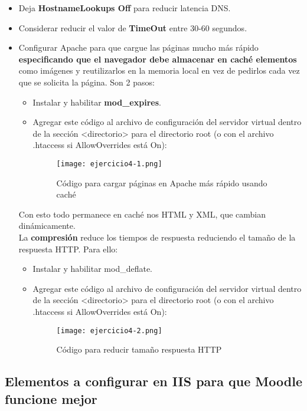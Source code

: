 \begin{itemize}
		\item Deja \textbf{HostnameLookups Off} para reducir latencia DNS.
		\item Considerar reducir el valor de \textbf{TimeOut} entre 30-60 segundos.
		\item Configurar Apache para que cargue las páginas mucho más rápido \textbf{especificando que el navegador debe almacenar en caché elementos} como imágenes y reutilizarlos en la memoria local en vez de pedirlos cada vez que se solicita la página. Son 2 pasos:
			\begin{itemize}
				\item Instalar y habilitar \textbf{mod\_expires}.
				\item Agregar este código al archivo de configuración del servidor virtual dentro de la sección <directorio> para el directorio root (o con el archivo .htaccess si AllowOverrides está On):
					\begin{figure}[H] 
						\centering
						\texttt{[image: ejercicio4-1.png]} 
						\label{figura21} 
						\caption{Código para cargar páginas en Apache más rápido usando caché}
					\end{figure}
			\end{itemize}
		Con esto todo permanece en caché nos HTML y XML, que cambian dinámicamente. \\
		La \textbf{compresión} reduce los tiempos de respuesta reduciendo el tamaño de la respuesta HTTP. Para ello:
			\begin{itemize}
				\item Instalar y habilitar mod\_deflate.
				\item Agregar este código al archivo de configuración del servidor virtual dentro de la sección <directorio> para el directorio root (o con el archivo .htaccess si AllowOverrides está On): 
					\begin{figure}[H] 
						\centering
						\texttt{[image: ejercicio4-2.png]} 
						\label{figura22} 
						\caption{Código para reducir tamaño respuesta HTTP}
					\end{figure}
			\end{itemize}
	\end{itemize}
	
	\subsection{Elementos a configurar en IIS para que Moodle funcione mejor}
	

